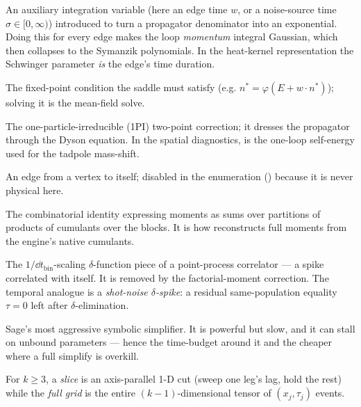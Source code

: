\begin{description}[leftmargin=0pt,style=nextline]
  \item[Schwinger parameter] An auxiliary integration variable (here an edge time
        $w$, or a noise-source time $\sigma\in[0,\infty)$) introduced to turn a
        propagator denominator into an exponential. Doing this for every edge makes
        the loop \emph{momentum} integral Gaussian, which then collapses to the
        Symanzik polynomials. In the heat-kernel representation the Schwinger
        parameter \emph{is} the edge's time duration.

  \item[Self-consistency equation] The fixed-point condition the saddle must satisfy
        (e.g. $n^{*}=\varphi(E+w\cdot n^{*})$); solving it is the mean-field solve.

  \item[Self-energy $\Sigma$] The one-particle-irreducible (1PI) two-point
        correction; it dresses the propagator through the Dyson equation. In the
        spatial diagnostics,  is the one-loop self-energy used for the
        tadpole mass-shift.

  \item[Self-loop] An edge from a vertex to itself; disabled in the enumeration
        () because it is never physical here.

  \item[Set partition / cluster expansion] The combinatorial identity expressing
        moments as sums over partitions of products of cumulants over the blocks. It
        is how  reconstructs full moments from the engine's
        native cumulants.

  \item[Shot noise / contact / diagonal term] The $1/\dd t_{\mathrm{bin}}$-scaling
        $\delta$-function piece of a point-process correlator --- a spike correlated
        with itself. It is removed by the factorial-moment correction. The temporal
        analogue is a \emph{shot-noise $\delta$-spike}: a residual same-population
        equality $\tau=0$ left after $\delta$-elimination.

  \item[\code{.simplify\_full()}] Sage's most aggressive symbolic simplifier. It is
        powerful but slow, and it can stall on unbound parameters --- hence the
         time-budget around it and the cheaper
         where a full simplify is overkill.

  \item[Slice / full grid] For $k\ge 3$, a \emph{slice} is an axis-parallel 1-D cut
        (sweep one leg's lag, hold the rest) while the \emph{full grid} is the entire
        $(k-1)$-dimensional tensor of $(x_j,\tau_j)$ events.


\end{description}
